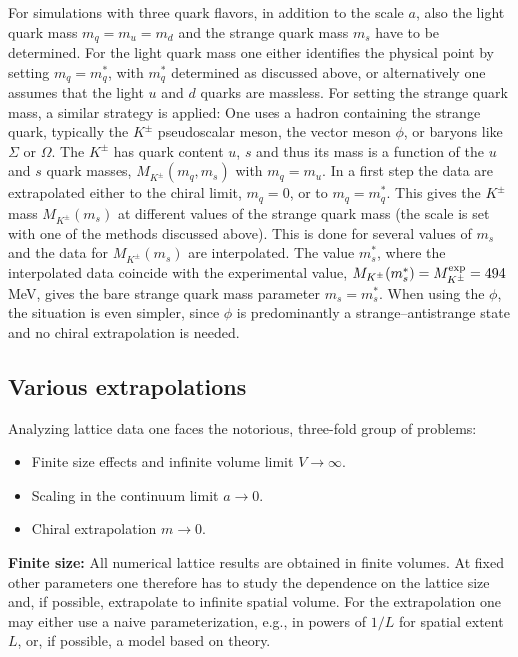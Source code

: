 For simulations with three quark flavors, in addition to the scale $a$, also
the light quark mass $m_q = m_u = m_d$ and the strange quark mass $m_s$ have to
be determined. For the light quark mass one either identifies the physical
point by setting $m_q = m_q^*$, with $m_q^*$ determined as discussed above, or
alternatively one assumes that the light $u$ and $d$ quarks are massless. For
setting the strange quark mass, a similar strategy is applied: One uses a
hadron containing the strange quark, typically the $K^\pm$ pseudoscalar meson,
the vector meson $\phi$, or baryons like $\Sigma$ or $\Omega$. The $K^\pm$ has
quark content $u$, $s$ and thus its mass is a function of the $u$ and $s$ quark
masses, $M_{K^\pm}(m_q, m_s)$ with $m_q = m_u$. In a first step the data are
extrapolated either to the chiral limit, $m_q = 0$, or to $m_q = m_q^*$. This
gives the $K^\pm$ mass $M_{K^\pm}(m_s)$ at different values of the strange quark
mass (the scale is set with one of the methods discussed above). This is done
for several values of $m_s$ and the data for $M_{K^\pm}(m_s)$ are interpolated.
The value $m_s^*$, where the interpolated data coincide with the experimental
value, $M_{K^\pm}(m_s^*) = M_{K^\pm}^{\rm exp} = 494$\,MeV, gives the bare
strange quark mass parameter $m_s = m_s^*$. When using the $\phi$, the situation
is even simpler, since $\phi$ is predominantly a strange--antistrange state and
no chiral extrapolation is needed.

\subsection{Various extrapolations}

Analyzing lattice data one faces the notorious, three-fold group of problems:
\begin{itemize}
  \item Finite size effects and infinite volume limit $V \to \infty$.
  \item Scaling in the continuum limit $a \to 0$.
  \item Chiral extrapolation $m \to 0$.
\end{itemize}

\textbf{Finite size:} All numerical lattice results are obtained in finite
volumes. At fixed other parameters one therefore has to study the dependence on
the lattice size and, if possible, extrapolate to infinite spatial volume. For
the extrapolation one may either use a naive parameterization, e.g., in powers
of $1/L$ for spatial extent $L$, or, if possible, a model based on theory.

